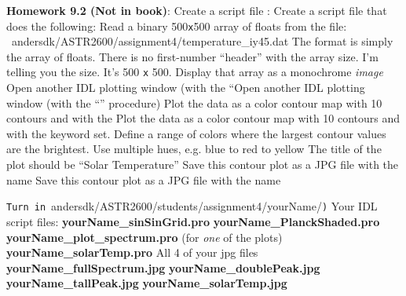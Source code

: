 \documentclass{article}
\begin{document}
\begin{spacing}{1.0}
\textbf{Homework 9.2 (Not in book)}: Create a script file : Create a script file  that does the following:
Read a binary 500\verb|x|500 array of floats from the file:
~andersdk/ASTR2600/assignment4/temperature_iy45.dat
The format is simply the array of floats. 
 There is no first-number “header” with the array size. I’m telling you the size. It’s 500 \verb|x| 500.
Display that array as a monochrome \emph{image}
Open another IDL plotting window (with the “Open another IDL plotting window (with the “” procedure)
Plot the data as a color contour map with 10 contours and with the Plot the data as a color contour map with 10 contours and with the  keyword set.
 Define a range of colors where the largest contour values are the brightest.  
 Use multiple hues, e.g. blue to red to yellow
The title of the plot should be “Solar Temperature”
Save this contour plot as a JPG file with the name Save this contour plot as a JPG file with the name 

\verb|Turn in|~andersdk/ASTR2600/students/assignment4/yourName/\verb|)|
Your IDL script files: 
\textbf{yourName_sinSinGrid.pro}
\textbf{yourName_PlanckShaded.pro}
\textbf{yourName_plot_spectrum.pro} (for \emph{one} of the plots)
\textbf{yourName_solarTemp.pro}
All 4 of your jpg files
\textbf{yourName_fullSpectrum.jpg}
\textbf{yourName_doublePeak.jpg}
\textbf{yourName_tallPeak.jpg}
\textbf{yourName_solarTemp.jpg}


\end{spacing}
\end{document}
